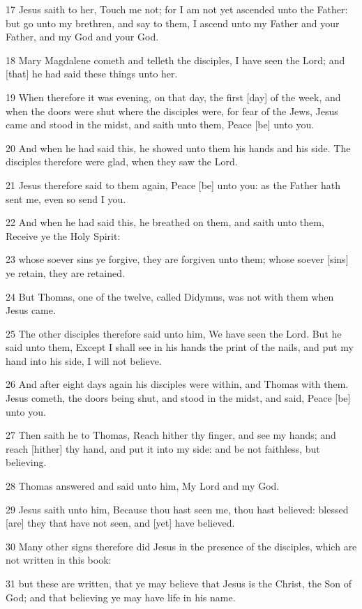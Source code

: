 \par 17 Jesus saith to her, Touch me not; for I am not yet ascended unto the Father: but go unto my brethren, and say to them, I ascend unto my Father and your Father, and my God and your God.
\par 18 Mary Magdalene cometh and telleth the disciples, I have seen the Lord; and [that] he had said these things unto her.
\par 19 When therefore it was evening, on that day, the first [day] of the week, and when the doors were shut where the disciples were, for fear of the Jews, Jesus came and stood in the midst, and saith unto them, Peace [be] unto you.
\par 20 And when he had said this, he showed unto them his hands and his side. The disciples therefore were glad, when they saw the Lord.
\par 21 Jesus therefore said to them again, Peace [be] unto you: as the Father hath sent me, even so send I you.
\par 22 And when he had said this, he breathed on them, and saith unto them, Receive ye the Holy Spirit:
\par 23 whose soever sins ye forgive, they are forgiven unto them; whose soever [sins] ye retain, they are retained.
\par 24 But Thomas, one of the twelve, called Didymus, was not with them when Jesus came.
\par 25 The other disciples therefore said unto him, We have seen the Lord. But he said unto them, Except I shall see in his hands the print of the nails, and put my hand into his side, I will not believe.
\par 26 And after eight days again his disciples were within, and Thomas with them. Jesus cometh, the doors being shut, and stood in the midst, and said, Peace [be] unto you.
\par 27 Then saith he to Thomas, Reach hither thy finger, and see my hands; and reach [hither] thy hand, and put it into my side: and be not faithless, but believing.
\par 28 Thomas answered and said unto him, My Lord and my God.
\par 29 Jesus saith unto him, Because thou hast seen me, thou hast believed: blessed [are] they that have not seen, and [yet] have believed.
\par 30 Many other signs therefore did Jesus in the presence of the disciples, which are not written in this book:
\par 31 but these are written, that ye may believe that Jesus is the Christ, the Son of God; and that believing ye may have life in his name.


